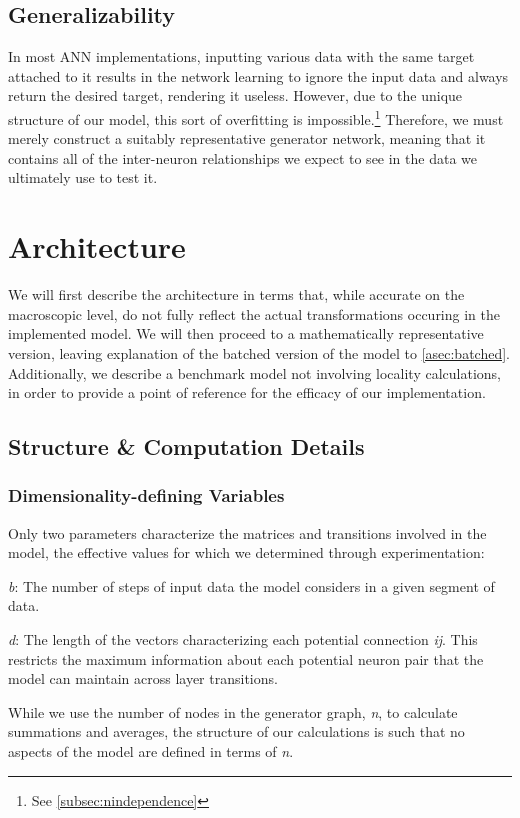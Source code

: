 \subsection{Generalizability}
\label{subsec:hotswap}
In most ANN implementations, inputting various data with the same target 
attached to it results in the network learning to ignore the input data and 
always return the desired target, rendering it useless. However, due to the 
unique structure of our model, this sort of overfitting is 
impossible.\footnote{See \ref{subsec:nindependence}} Therefore, we must merely 
construct a suitably representative generator network, meaning that it contains 
all of the inter-neuron relationships we expect to see in the data we ultimately 
use to test it.

\section{Architecture}
We will first describe the architecture in terms that, while accurate on the 
macroscopic level, do not fully reflect the actual transformations occuring in 
the implemented model. We will then proceed to a mathematically representative 
version, leaving explanation of the batched version of the model to 
\ref{asec:batched}. Additionally, we describe a benchmark model not involving 
locality calculations, in order to provide a point of reference for the efficacy 
of our implementation.

\subsection{Structure \& Computation Details}
\subsubsection{Dimensionality-defining Variables}
Only two parameters characterize the matrices and transitions involved in the 
model, the effective values for which we determined through experimentation:
\begin{description}
	\item \textit{b}: The number of steps of input data the model considers in a 
		given segment of data.
	\item \textit{d}: The length of the vectors characterizing each potential 
		connection \textit{ij}. This restricts the maximum information about 
		each potential neuron pair that the model can maintain across layer 
		transitions.
\end{description}
While we use the number of nodes in the generator graph, \textit{n}, to 
calculate summations and averages, the structure of our calculations is such 
that no aspects of the model are defined in terms of \textit{n}.

